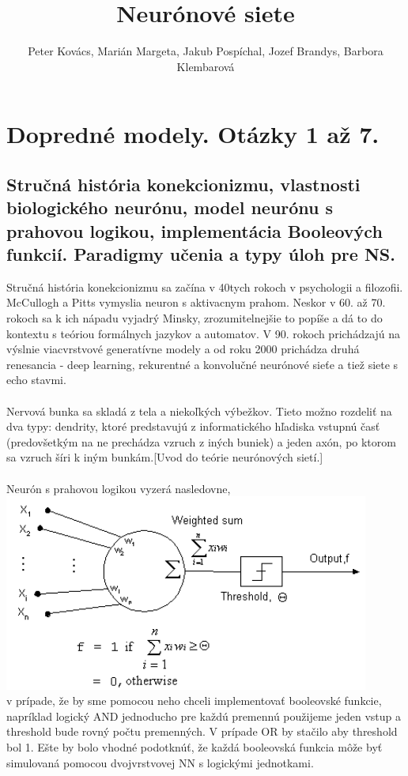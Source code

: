 \documentclass{article}
\title{ Neurónové siete}
\author{Peter Kovács, Marián Margeta, Jakub Pospíchal, Jozef Brandys, Barbora Klembarová}
\date{ }
\numberwithin{equation}{section} %
\begin{document}
\maketitle
\tableofcontents
\newpage
\section{Dopredné modely. Otázky 1 až 7. }
\subsection{Stručná história konekcionizmu, vlastnosti biologického neurónu, model neurónu s prahovou logikou,
implementácia Booleových funkcií. Paradigmy učenia a typy úloh pre NS.}
Stručná história konekcionizmu sa začína v 40tych rokoch v psychologii a filozofii. McCullogh a Pitts vymyslia neuron s aktivacnym prahom. Neskor v 60. až 70. rokoch sa k ich nápadu vyjadrý Minsky, zrozumitelnejšie to popíše a dá to do kontextu s teóriou formálnych jazykov a automatov. V 90. rokoch prichádzajú na výslnie viacvrstvové generatívne modely a od roku 2000 prichádza druhá renesancia - deep learning, rekurentné a konvolučné neurónové sieťe a tiež siete s echo stavmi.
\\\\
Nervová bunka sa skladá z tela a niekoľkých výbežkov. Tieto možno rozdeliť na dva typy: dendrity, ktoré predstavujú z informatického hľadiska vstupnú časť (predovšetkým na ne prechádza vzruch z iných buniek) a jeden axón, po ktorom sa vzruch šíri k iným bunkám.[Uvod do teórie neurónových sietí.]
\\\\
Neurón s prahovou logikou vyzerá nasledovne, \\
\includegraphics[width=12cm]{imgs/threshold_neuron}\\
v prípade, že by sme pomocou neho chceli implementovať booleovské funkcie, napríklad logický AND jednoducho pre každú premennú použijeme jeden vstup a threshold bude rovný počtu premenných. V prípade OR by stačilo aby threshold bol 1. Ešte by bolo vhodné podotknúť, že každá booleovská funkcia môže byť simulovaná pomocou dvojvrstvovej NN s logickými jednotkami.
\end{document}
